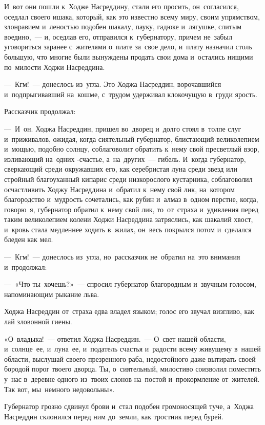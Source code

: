 \documentclass[12pt,a4paper]{book}
\begin{document}
И~вот они пошли к~Ходже Насреддину, стали его просить, он~согласился, оседлал своего ишака, который, как это известно всему миру, своим упрямством, злонравием и~леностью подобен шакалу, пауку, гадюке и~лягушке, слитым воедино,~— и, оседлав его, отправился к~губернатору, причем не~забыл уговориться заранее с~жителями о~плате за~свое дело, и~плату назначил столь большую, что многие были вынуждены продать свои дома и~остались нищими по~милости Ходжи Насреддина.

—~Кгм!~— донеслось из~угла. Это Ходжа Насреддин, ворочавшийся и~подпрыгивавший на~кошме, с~трудом удерживал клокочущую в~груди ярость.

Рассказчик продолжал:

—~И~он. Ходжа Насреддин, пришел во~дворец и~долго стоял в~толпе слуг и~приживалов, ожидая, когда сиятельный губернатор, блистающий великолепием и~мощью, подобно солнцу, соблаговолит обратить к~нему свой пресветлый взор, изливающий на~одних -счастье, а~на~других~— гибель. И~когда губернатор, сверкающий среди окружавших его, как серебристая луна среди звезд или стройный благоуханный кипарис среди низкорослого кустарника, соблаговолил осчастливить Ходжу Насреддина и~обратил к~нему свой лик, на~котором благородство и~мудрость сочетались, как рубин и~алмаз в~одном перстне, когда, говорю~я, губернатор обратил к~нему свой лик, то~от~страха и~удивления перед таким великолепием колени Ходжи Насреддина затряслись, как шакалий хвост, и~кровь стала медленнее ходить в~жилах, он~весь покрылся потом и~сделался бледен как мел.

—~Кгм!~— донеслось из~угла, но~рассказчик не~обратил на~это внимания и~продолжал:

—~«Что ты~хочешь?»~— спросил губернатор благородным и~звучным голосом, напоминающим рыкание льва.

Ходжа Насреддин от~страха едва владел языком; голос его звучал визгливо, как лай зловонной гиены.

«О~владыка!~— ответил Ходжа Насреддин.~— О~свет нашей области, и~солнце~ее, и~луна~ее, и~податель счастья и~радости всему живущему в~нашей области, выслушай своего презренного раба, недостойного даже вытирать своей бородой порог твоего дворца. Ты, о~сиятельный, милостиво соизволил поместить у~нас в~деревне одного из~твоих слонов на~постой и~прокормление от~жителей. Так вот, мы~немного недовольны».

Губернатор грозно сдвинул брови и~стал подобен громоносящей туче, а~Ходжа Насреддин склонился перед ним до~земли, как тростник перед бурей.
\end{document}
